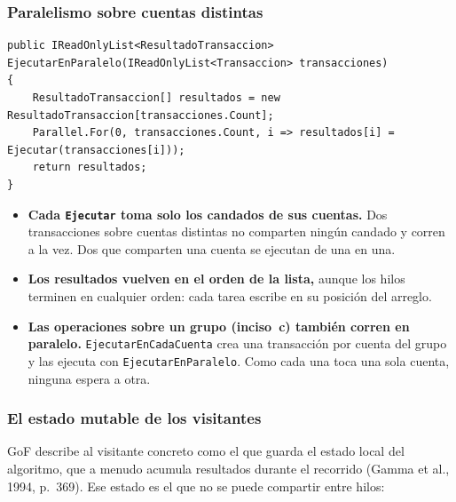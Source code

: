 \subsubsection{Paralelismo sobre cuentas distintas}

\begin{lstlisting}[basicstyle=\ttfamily\footnotesize, columns=fullflexible, keepspaces=true]
public IReadOnlyList<ResultadoTransaccion> EjecutarEnParalelo(IReadOnlyList<Transaccion> transacciones)
{
    ResultadoTransaccion[] resultados = new ResultadoTransaccion[transacciones.Count];
    Parallel.For(0, transacciones.Count, i => resultados[i] = Ejecutar(transacciones[i]));
    return resultados;
}
\end{lstlisting}

\begin{itemize}
  \item \textbf{Cada \texttt{Ejecutar} toma solo los candados de sus cuentas.} Dos
        transacciones sobre cuentas distintas no comparten ningún candado y corren a la vez.
        Dos que comparten una cuenta se ejecutan de una en una.
  \item \textbf{Los resultados vuelven en el orden de la lista,} aunque los hilos terminen en
        cualquier orden: cada tarea escribe en su posición del arreglo.
  \item \textbf{Las operaciones sobre un grupo (inciso~c) también corren en paralelo.}
        \texttt{EjecutarEnCadaCuenta} crea una transacción por cuenta del grupo y las ejecuta
        con \texttt{EjecutarEnParalelo}. Como cada una toca una sola cuenta, ninguna espera a
        otra.
\end{itemize}

\subsubsection{El estado mutable de los visitantes}

GoF describe al visitante concreto como el que guarda el estado local del algoritmo, que a
menudo acumula resultados durante el recorrido (Gamma et al., 1994, p.~369). Ese estado es el
que no se puede compartir entre hilos:

